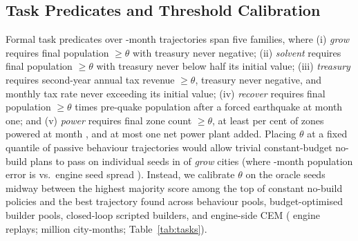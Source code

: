 \begin{table}[tbp]
\caption{ConvNeXt U-Net + bookkeeping world-model dimensions across our three parameter scales, extracted directly from run configurations.}
\label{tab:hyper-sizes}
\centering\scriptsize\setlength{\tabcolsep}{4pt}

\end{table}

\begin{table}[tbp]
\caption{Complete world-model training manifest covering objective, parameter scale, dataset split and transition count, random seed, training examples, peak learning rate, gradient-accumulation micro-batch, pushforward parent checkpoint, and truncated SHA-256 digests at mid-training and full budget (the final row reports the coverage-retrained model of Section~\ref{sec:coverage}).}
\label{tab:hyper-runs}
\centering\scriptsize\setlength{\tabcolsep}{3.5pt}

\end{table}

\subsection{Task Predicates and Threshold Calibration}\label{app:tasks}

Formal task predicates over \Horizon-month trajectories span five families, where (i) \emph{grow} requires final population $\ge \theta$ with treasury never negative; (ii) \emph{solvent} requires final population $\ge \theta$ with treasury never below half its initial value; (iii) \emph{treasury} requires second-year annual tax revenue $\ge \theta$, treasury never negative, and monthly tax rate never exceeding its initial value; (iv) \emph{recover} requires final population $\ge \theta$ times pre-quake population after a forced earthquake at month one; and (v) \emph{power} requires final zone count $\ge \theta$, at least \PowerFrac{} per cent of zones powered at month \Horizon{}, and at most one net power plant added. Placing $\theta$ at a fixed quantile of passive behaviour trajectories would allow trivial constant-budget no-build plans to pass on individual seeds in \ConstPassGrow{} of \emph{grow} cities (where \RollA-month population error is \TestMainPop{} vs.\ engine seed spread \TestFloorPop{}). Instead, we calibrate $\theta$ on the \OracleSeeds{} oracle seeds midway between the highest majority score among the top \BestConstK{} of \ConstantPlans{} constant no-build policies and the best trajectory found across behaviour pools, budget-optimised builder pools, closed-loop scripted builders, and engine-side CEM (\ThresholdReplays{} engine replays; \ThresholdCityMonths{} million city-months; Table~\ref{tab:tasks}).

